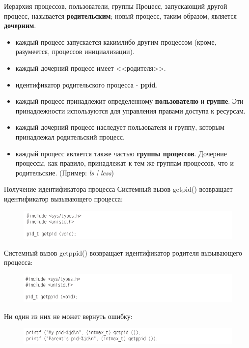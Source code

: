 \documentclass{beamer}
\begin{document}
\begin{frame}{Иерархия процессов, пользователи, группы}
Процесс, запускающий другой процесс, называется \textbf{родительским}; новый процесс, таким образом, является \textbf{дочерним}.
\begin{itemize}
\item каждый процесс запускается каким­либо другим процессом (кроме, разумеется, процессов инициализации). 
\item каждый дочерний процесс имеет <<родителя>>. 
\item идентификатор родительского процесса - \textbf{ppid}.
\item каждый процесс принадлежит определенному \textbf{пользователю} и \textbf{группе}. Эти принадлежности используются для управления правами доступа к ресурсам. 
\item каждый дочерний процесс наследует пользователя и группу, которым принадлежал родительский процесс.
\item каждый процесс является также частью \textbf{группы процессов}. Дочерние процессы, как правило, принадлежат к тем же группам процессов, что и родительские.
(Пример: \textit{ls | less}) 
\end{itemize}
\end{frame}

\begin{frame}{Получение идентификатора процесса}
Системный вызов getpid() возвращает идентификатор вызывающего процесса:
\begin{figure}[h]
\centering
\includegraphics[scale=0.5]{images/lec07-pic01.png}
\end{figure}
Системный вызов getppid() возвращает идентификатор родителя вызывающего процесса:
\begin{figure}[h]
\centering
\includegraphics[scale=0.5]{images/lec07-pic02.png}
\end{figure}
Ни один из них не может вернуть ошибку:
\begin{figure}[h]
\centering
\includegraphics[scale=0.5]{images/lec07-pic03.png}
\end{figure}
\end{frame}
\end{document}
